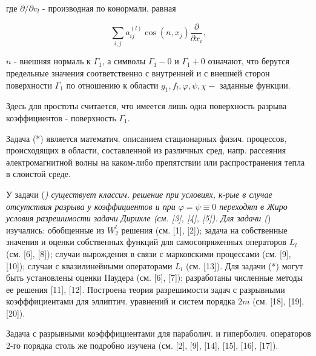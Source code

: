 \documentclass[10pt]{article}
\begin{document}
где $\partial / \partial v_{l}$ - производная по конормали, равная



\[

\sum_{i, j} a_{i j}^{(l)} \cos \left(n, x_{j}\right) \frac{\partial}{\partial x_{i}},

\]



$n$ - внешняя нормаль к $\Gamma_{1}$, а символы $\Gamma_{1}-0$ и $\Gamma_{1}+0$ означают, что берутся предельные значения соответственно с внутренней и с внешней сторон поверхности $\Gamma_{1}$ по отношению к области $g_{1}, f_{l}, \varphi, \psi, \chi-$ заданные функции.



Здесь для простоты считается, что имеется лишь одна поверхность разрыва коэффициентов - поверхность $\Gamma_{1}$.



Задача (*) является математич. описанием стационарных физич. процессов, происходящих в области, составленной из различных сред, напр. рассеяния әлектромагнитной волны на каком-либо препятствии или распространения тепла в слоистой среде.



У задачи (\textit{) существует классич. решение при условиях, к-рые в случае отсутствия разрыва у коэффициентов и при $\varphi=\psi \equiv 0$ переходят в Жиро условия разрешимости задачи Дирихле (см. [3], [4], [5]). Для задачи (}) изучались: обобщенные из $W_{2}^{l}$ решения (см. [1], [2]); задача на собственные значения и оценки собственных функций для самосопряженных операторов $L_{l}$ (см. [6], [8]); случаи вырождения в связи с марковскими процессами (см. [9], [10]); случаи с квазилинейными операторами $L_{l}$ (см. [13]). Для задачи (*) могут быть установлены оценки IIаудера (см. [6], [7]); разработаны численные методы ее решения [11], [12]. Построена теория разрешимости задач с разрывными коэфффициентами для эллиптич. уравнений и систем порядка $2 m$ (см. [18], [19], [20]).



Задача с разрывными коэфффициентами для параболич. и гиперболич. операторов 2-го порядка столь же подробно изучена (см. [2], [9], [14], [15], [16], [17]).
\end{document}
